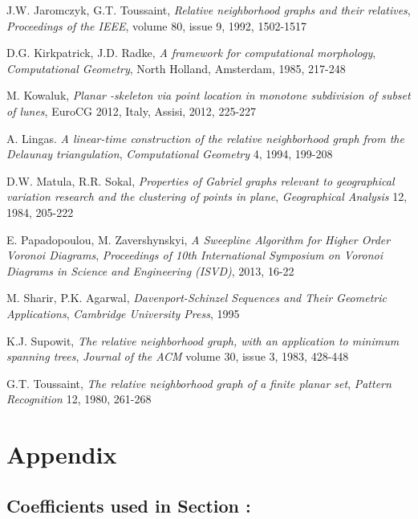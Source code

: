\documentclass[11pt]{llncs}
\begin{document}
\begin{thebibliography}{50}
J.W. Jaromczyk, G.T. Toussaint, 
\textit{Relative neighborhood graphs and their relatives}, 
\textit{Proceedings of the IEEE}, volume 80, issue 9, 1992, 1502-1517

D.G. Kirkpatrick, J.D. Radke, 
\textit{A framework for computational morphology}, 
\textit{Computational Geometry}, North Holland, Amsterdam, 1985, 217-248

M. Kowaluk,
\textit{Planar -skeleton via point location in monotone subdivision of subset of lunes},
EuroCG 2012, Italy, Assisi, 2012, 225-227



A. Lingas. 
\textit {A linear-time construction of the relative neighborhood graph 
from the Delaunay triangulation}, 
\textit{Computational Geometry} 4, 1994, 199-208



D.W. Matula, R.R. Sokal, 
\textit{Properties of Gabriel graphs relevant to geographical variation research 
and the clustering of points in plane}, 
\textit{Geographical Analysis} 12, 1984, 205-222

E. Papadopoulou, M. Zavershynskyi,
\textit{A Sweepline Algorithm for Higher Order Voronoi Diagrams}, 
\textit{Proceedings of 10th International Symposium on Voronoi Diagrams in Science and Engineering (ISVD)}, 2013, 16-22 

M. Sharir, P.K. Agarwal,
\textit{Davenport-Schinzel Sequences and Their Geometric Applications},
\textit{Cambridge University Press}, 1995

K.J. Supowit, 
\textit{The relative neighborhood graph, with an application to minimum spanning trees}, 
\textit{Journal of the ACM} volume 30, issue 3, 1983, 428-448

G.T. Toussaint, 
\textit{The relative neighborhood graph of a finite planar set}, 
\textit{Pattern Recognition} 12, 1980, 261-268 

\end{thebibliography}

\clearpage

\section{Appendix}

\subsection{Coefficients used in Section :} 
\end{document}
